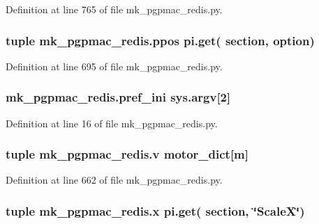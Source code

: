 Definition at line 765 of file mk\-\_\-pgpmac\-\_\-redis.\-py.

\hypertarget{namespacemk__pgpmac__redis_ad9356b4b4c48789f17e6e8fd682e2798}{
\subsubsection[{ppos}]{\setlength{\rightskip}{0pt plus 5cm}tuple mk\-\_\-pgpmac\-\_\-redis.\-ppos pi.\-get( section, option)}}\label{namespacemk__pgpmac__redis_ad9356b4b4c48789f17e6e8fd682e2798}


Definition at line 695 of file mk\-\_\-pgpmac\-\_\-redis.\-py.

\hypertarget{namespacemk__pgpmac__redis_a38c785af5201403976e1267c47ea5096}{
\subsubsection[{pref\-\_\-ini}]{\setlength{\rightskip}{0pt plus 5cm}mk\-\_\-pgpmac\-\_\-redis.\-pref\-\_\-ini sys.\-argv\mbox{[}2\mbox{]}}}\label{namespacemk__pgpmac__redis_a38c785af5201403976e1267c47ea5096}


Definition at line 16 of file mk\-\_\-pgpmac\-\_\-redis.\-py.

\hypertarget{namespacemk__pgpmac__redis_ac732d49b0afca9a9951e3a252bae42fc}{
\subsubsection[{v}]{\setlength{\rightskip}{0pt plus 5cm}tuple mk\-\_\-pgpmac\-\_\-redis.\-v {\bf motor\-\_\-dict}\mbox{[}m\mbox{]}}}\label{namespacemk__pgpmac__redis_ac732d49b0afca9a9951e3a252bae42fc}


Definition at line 662 of file mk\-\_\-pgpmac\-\_\-redis.\-py.

\hypertarget{namespacemk__pgpmac__redis_abc8696f6f2f3fd3edd30989d3c8ec301}{
\subsubsection[{x}]{\setlength{\rightskip}{0pt plus 5cm}tuple mk\-\_\-pgpmac\-\_\-redis.\-x pi.\-get( section, \char`\"{}Scale\-X\char`\"{})}}\label{namespacemk__pgpmac__redis_abc8696f6f2f3fd3edd30989d3c8ec301}


